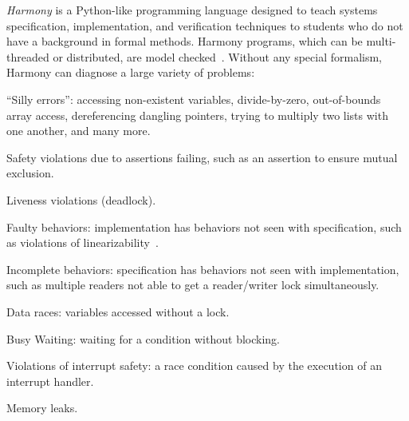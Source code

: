 \documentclass[twocolumn]{article}
\begin{document}
\emph{Harmony} is a Python-like programming language designed to teach
systems specification, implementation, and verification techniques to
students who do not have a background in formal methods.
Harmony programs, which can be multi-threaded
or distributed, are model checked~\cite{CES86}.
Without any special formalism, Harmony can diagnose a large variety
of problems:
\begin{compactitem}
\item ``Silly errors'': accessing non-existent variables,
divide-by-zero, out-of-bounds array access, dereferencing dangling
pointers, trying to multiply two lists with one another,
and many more.
\item Safety violations due to assertions failing, such as an assertion to ensure mutual exclusion.
\item Liveness violations (deadlock).
\item Faulty behaviors: implementation has behaviors not seen with specification, such as violations of linearizability~\cite{HW90}.
\item Incomplete behaviors: specification has behaviors not seen with implementation, such as multiple readers not able to get a reader/writer lock simultaneously.
\item Data races: variables accessed without a lock.
\item Busy Waiting: waiting for a condition without blocking.
\item Violations of interrupt safety: a race condition caused by the execution
of an interrupt handler.
\item Memory leaks.
\end{compactitem}
\end{document}
